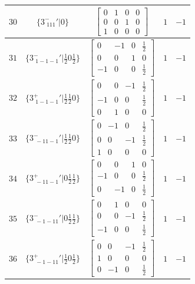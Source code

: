 \documentclass[fleqn,8pt]{jsarticle}
\begin{document}
\begin{longtable}{ccccc}
$ 30 $ & $ \{3^{-}_{\,\,111}{}'|0\} $ & $ \begin{bmatrix} 0 & 1 & 0 & 0 \\ 0 & 0 & 1 & 0 \\ 1 & 0 & 0 & 0 \end{bmatrix} $ & $ 1 $ & $ -1 $ \\ \hline
$ 31 $ & $ \{3^{-}_{\,\,1-1-1}{}'|\frac{1}{2} 0 \frac{1}{2}\} $ & $ \begin{bmatrix} 0 & -1 & 0 & \frac{1}{2} \\ 0 & 0 & 1 & 0 \\ -1 & 0 & 0 & \frac{1}{2} \end{bmatrix} $ & $ 1 $ & $ -1 $ \\ \hline
$ 32 $ & $ \{3^{+}_{\,\,1-1-1}{}'|\frac{1}{2} \frac{1}{2} 0\} $ & $ \begin{bmatrix} 0 & 0 & -1 & \frac{1}{2} \\ -1 & 0 & 0 & \frac{1}{2} \\ 0 & 1 & 0 & 0 \end{bmatrix} $ & $ 1 $ & $ -1 $ \\ \hline
$ 33 $ & $ \{3^{-}_{\,\,-11-1}{}'|\frac{1}{2} \frac{1}{2} 0\} $ & $ \begin{bmatrix} 0 & -1 & 0 & \frac{1}{2} \\ 0 & 0 & -1 & \frac{1}{2} \\ 1 & 0 & 0 & 0 \end{bmatrix} $ & $ 1 $ & $ -1 $ \\ \hline
$ 34 $ & $ \{3^{+}_{\,\,-11-1}{}'|0 \frac{1}{2} \frac{1}{2}\} $ & $ \begin{bmatrix} 0 & 0 & 1 & 0 \\ -1 & 0 & 0 & \frac{1}{2} \\ 0 & -1 & 0 & \frac{1}{2} \end{bmatrix} $ & $ 1 $ & $ -1 $ \\ \hline
$ 35 $ & $ \{3^{-}_{\,\,-1-11}{}'|0 \frac{1}{2} \frac{1}{2}\} $ & $ \begin{bmatrix} 0 & 1 & 0 & 0 \\ 0 & 0 & -1 & \frac{1}{2} \\ -1 & 0 & 0 & \frac{1}{2} \end{bmatrix} $ & $ 1 $ & $ -1 $ \\ \hline
$ 36 $ & $ \{3^{+}_{\,\,-1-11}{}'|\frac{1}{2} 0 \frac{1}{2}\} $ & $ \begin{bmatrix} 0 & 0 & -1 & \frac{1}{2} \\ 1 & 0 & 0 & 0 \\ 0 & -1 & 0 & \frac{1}{2} \end{bmatrix} $ & $ 1 $ & $ -1 $ \\ \hline

\end{longtable}
\end{document}
